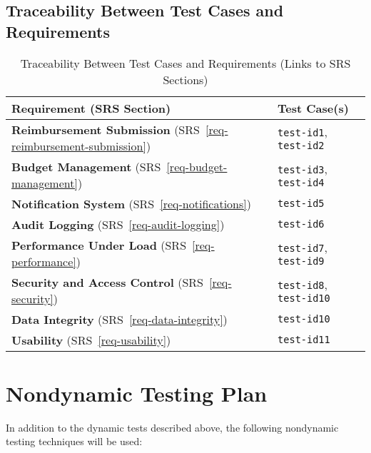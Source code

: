 \documentclass[12pt, titlepage]{article}
\begin{document}
\subsection{Traceability Between Test Cases and Requirements}

\begin{table}[h]
  \centering
  \begin{tabular}{|m{6cm}|m{7cm}|}
      \hline
      \textbf{Requirement (SRS Section)} & \textbf{Test Case(s)} \\
      \hline
      \textbf{Reimbursement Submission} 
        (SRS~\ref{req-reimbursement-submission}) 
      & \texttt{test-id1}, \texttt{test-id2} \\
      \hline
      \textbf{Budget Management} 
        (SRS~\ref{req-budget-management}) 
      & \texttt{test-id3}, \texttt{test-id4} \\
      \hline
      \textbf{Notification System} 
        (SRS~\ref{req-notifications}) 
      & \texttt{test-id5} \\
      \hline
      \textbf{Audit Logging} 
        (SRS~\ref{req-audit-logging}) 
      & \texttt{test-id6} \\
      \hline
      \textbf{Performance Under Load} 
        (SRS~\ref{req-performance}) 
      & \texttt{test-id7}, \texttt{test-id9} \\
      \hline
      \textbf{Security and Access Control} 
        (SRS~\ref{req-security}) 
      & \texttt{test-id8}, \texttt{test-id10} \\
      \hline
      \textbf{Data Integrity} 
        (SRS~\ref{req-data-integrity}) 
      & \texttt{test-id10} \\
      \hline
      \textbf{Usability} 
        (SRS~\ref{req-usability}) 
      & \texttt{test-id11} \\
      \hline
    \end{tabular}
  \caption{Traceability Between Test Cases and Requirements (Links to SRS Sections)}
\end{table}

\clearpage

\section{Nondynamic Testing Plan}
In addition to the dynamic tests described above, the following nondynamic testing techniques will be used:
\end{document}
